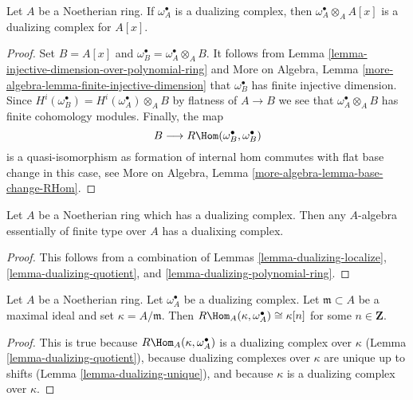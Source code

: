 \begin{lemma}
\label{lemma-dualizing-polynomial-ring}
Let $A$ be a Noetherian ring. If $\omega_A^\bullet$ is a dualizing
complex, then $\omega_A^\bullet \otimes_A A[x]$ is a dualizing
complex for $A[x]$.
\end{lemma}

\begin{proof}
Set $B = A[x]$ and $\omega_B^\bullet = \omega_A^\bullet \otimes_A B$.
It follows from Lemma \ref{lemma-injective-dimension-over-polynomial-ring}
and More on Algebra, Lemma \ref{more-algebra-lemma-finite-injective-dimension}
that $\omega_B^\bullet$ has finite injective dimension.
Since $H^i(\omega_B^\bullet) = H^i(\omega_A^\bullet) \otimes_A B$
by flatness of $A \to B$ we see that $\omega_A^\bullet \otimes_A B$
has finite cohomology modules. Finally, the map
$$
B \longrightarrow R\Hom(\omega_B^\bullet, \omega_B^\bullet)
$$
is a quasi-isomorphism as formation of internal hom commutes with
flat base change in this case, see
More on Algebra, Lemma \ref{more-algebra-lemma-base-change-RHom}.
\end{proof}

\begin{proposition}
\label{proposition-dualizing-essentially-finite-type}
Let $A$ be a Noetherian ring which has a dualizing complex.
Then any $A$-algebra essentially of finite type over $A$
has a dualixing complex.
\end{proposition}

\begin{proof}
This follows from a combination of
Lemmas \ref{lemma-dualizing-localize},
\ref{lemma-dualizing-quotient}, and \ref{lemma-dualizing-polynomial-ring}.
\end{proof}

\begin{lemma}
\label{lemma-find-function}
Let $A$ be a Noetherian ring. Let $\omega_A^\bullet$ be a dualizing
complex. Let $\mathfrak m \subset A$ be a maximal ideal and set
$\kappa = A/\mathfrak m$. Then
$R\Hom_A(\kappa, \omega_A^\bullet) \cong \kappa[n]$ for some
$n \in \mathbf{Z}$.
\end{lemma}

\begin{proof}
This is true because $R\Hom_A(\kappa, \omega_A^\bullet)$ is a dualizing
complex over $\kappa$ (Lemma \ref{lemma-dualizing-quotient}),
because dualizing complexes over $\kappa$ are unique up to shifts
(Lemma \ref{lemma-dualizing-unique}), and because $\kappa$ is a
dualizing complex over $\kappa$.
\end{proof}




